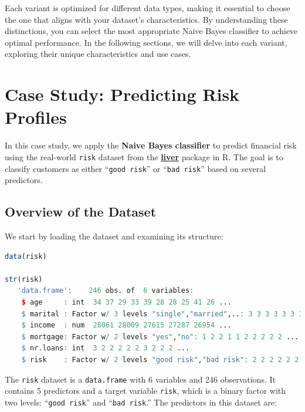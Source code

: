 \documentclass[
]{book}
\newcommand{\passthrough}[1]{#1}
\theoremstyle{definition}
\theoremstyle{definition}
\theoremstyle{definition}
\theoremstyle{definition}
\theoremstyle{remark}
\begin{document}
Each variant is optimized for different data types, making it essential to choose the one that aligns with your dataset's characteristics. By understanding these distinctions, you can select the most appropriate Naive Bayes classifier to achieve optimal performance. In the following sections, we will delve into each variant, exploring their unique characteristics and use cases.

\section{Case Study: Predicting Risk Profiles}\label{case-study-predicting-risk-profiles}

In this case study, we apply the \textbf{Naive Bayes classifier} to predict financial risk using the real-world \passthrough{\lstinline!risk!} dataset from the \href{https://CRAN.R-project.org/package=liver}{\textbf{liver}} package in R. The goal is to classify customers as either ``\passthrough{\lstinline!good risk!}'' or ``\passthrough{\lstinline!bad risk!}'' based on several predictors.

\subsection*{Overview of the Dataset}\label{overview-of-the-dataset}

We start by loading the dataset and examining its structure:

\begin{lstlisting}[language=R]
data(risk)

str(risk)
   'data.frame':    246 obs. of  6 variables:
    $ age     : int  34 37 29 33 39 28 28 25 41 26 ...
    $ marital : Factor w/ 3 levels "single","married",..: 3 3 3 3 3 3 3 3 3 3 ...
    $ income  : num  28061 28009 27615 27287 26954 ...
    $ mortgage: Factor w/ 2 levels "yes","no": 1 2 2 1 1 2 2 2 2 2 ...
    $ nr.loans: int  3 2 2 2 2 2 3 2 2 2 ...
    $ risk    : Factor w/ 2 levels "good risk","bad risk": 2 2 2 2 2 2 2 2 2 2 ...
\end{lstlisting}

The \passthrough{\lstinline!risk!} dataset is a \passthrough{\lstinline!data.frame!} with 6 variables and 246 observations. It contains 5 predictors and a target variable \passthrough{\lstinline!risk!}, which is a binary factor with two levels: ``\passthrough{\lstinline!good risk!}'' and ``\passthrough{\lstinline!bad risk!}.'' The predictors in this dataset are:
\end{document}
